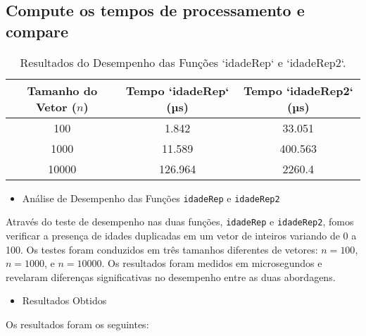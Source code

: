 \subsection{Compute os tempos de processamento e compare}

\begin{table}[ht]
    \centering
    \caption{Resultados do Desempenho das Funções `idadeRep` e `idadeRep2`.}
    \begin{tabular}{@{}ccc@{}}
        \toprule
        Tamanho do Vetor (\(n\)) & Tempo `idadeRep` (µs) & Tempo `idadeRep2` (µs) \\ \midrule
        100       & 1.842               & 33.051               \\
        1000      & 11.589              & 400.563              \\
        10000     & 126.964             & 2260.4               \\ \bottomrule
    \end{tabular}
    \label{tab:resultados}
\end{table}

\begin{itemize}
    \item Análise de Desempenho das Funções \texttt{idadeRep} e \texttt{idadeRep2}
\end{itemize}
Através do teste de desempenho nas duas funções, \texttt{idadeRep} e \texttt{idadeRep2}, fomos verificar a presença de idades duplicadas em um vetor de inteiros variando de 0 a 100. Os testes foram conduzidos em três tamanhos diferentes de vetores: \( n = 100 \), \( n = 1000 \), e \( n = 10000 \). Os resultados foram medidos em microsegundos e revelaram diferenças significativas no desempenho entre as duas abordagens.

\begin{itemize}
    \item Resultados Obtidos
\end{itemize}
Os resultados foram os seguintes:

